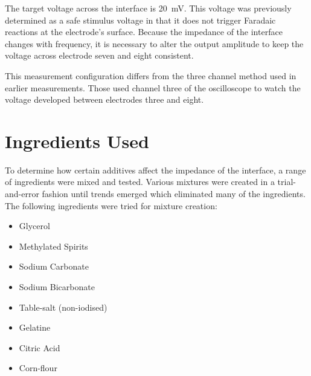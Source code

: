   The target voltage across the interface is \SI{20}{\milli\volt}.
  This voltage was previously determined as a safe stimulus voltage in that it does not trigger Faradaic reactions at the electrode's surface.
  Because the impedance of the interface changes with frequency, it is necessary to alter the output amplitude to keep the voltage across electrode seven and eight consistent.
  
  This measurement configuration differs from the three channel method used in earlier measurements.
  Those used channel three of the oscilloscope to watch the voltage developed between electrodes three and eight.
  

\section{Ingredients Used}


  To determine how certain additives affect the impedance of the interface, a range of ingredients were mixed and tested.
  Various mixtures were created in a trial-and-error fashion until trends emerged which eliminated many of the ingredients.
  The following ingredients were tried for mixture creation:
  \begin{itemize}
      \item Glycerol
      \item Methylated Spirits
      \item Sodium Carbonate
      \item Sodium Bicarbonate
      \item Table-salt (non-iodised)
      \item Gelatine
      \item Citric Acid
      \item Corn-flour
  \end{itemize}




